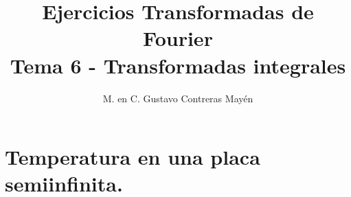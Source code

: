 
\title{Ejercicios Transformadas de Fourier \\ \large {Tema 6 - Transformadas integrales} \vspace{-3ex}}
\author{M. en C. Gustavo Contreras Mayén}
\date{ }

\vspace{-4cm}
\maketitle
\fontsize{14}{14}\selectfont
\tableofcontents
\newpage

\section{Temperatura en una placa semiinfinita.}

